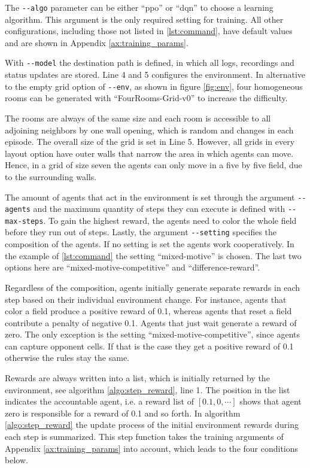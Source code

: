 The \verb|--algo| parameter can be either ``ppo'' or ``dqn'' to choose a learning algorithm. This argument is the only required setting for training. All other configurations, including those not listed in \ref{lst:command}, have default values and are shown in Appendix \ref{ax:training_params}.

With \verb|--model| the destination path is defined, in which all logs, recordings and status updates are stored. Line 4 and 5 configures the environment. In alternative to the empty grid option of \verb|--env|, as shown in figure \ref{fig:env}, four homogeneous rooms can be generated with ``FourRooms-Grid-v0'' to increase the difficulty. 

The rooms are always of the same size and each room is accessible to all adjoining neighbors by one wall opening, which is random and changes in each episode. The overall size of the grid is set in Line 5. However, all grids in every layout option have outer walls that narrow the area in which agents can move. Hence, in a grid of size seven the agents can only move in a five by five field, due to the surrounding walls.

The amount of agents that act in the environment is set through the argument \verb|--agents| and the maximum quantity of steps they can execute is defined with \verb|--max-steps|. To gain the highest reward, the agents need to color the whole field before they run out of steps. Lastly, the argument \verb|--setting| specifies the composition of the agents. If no setting is set the agents work cooperatively. In the example of \ref{lst:command} the setting ``mixed-motive'' is chosen. The last two options here are ``mixed-motive-competitive'' and ``difference-reward''.

Regardless of the composition, agents initially generate separate rewards in each step based on their individual environment change. For instance, agents that color a field produce a positive reward of 0.1, whereas agents that reset a field contribute a penalty of negative 0.1. Agents that just wait generate a reward of zero. The only exception is the setting ``mixed-motive-competitive'', since agents can capture opponent cells. If that is the case they get a positive reward of 0.1 otherwise the rules stay the same. 

Rewards are always written into a list, which is initially returned by the environment, see algorithm \ref{algo:step_reward}, line 1. The position in the list indicates the accountable agent, i.e. a reward list of $[0.1, 0, \cdots ]$ shows that agent zero is responsible for a reward of 0.1 and so forth. In algorithm \ref{algo:step_reward} the update process of the initial environment rewards during each step is summarized. This step function takes the training arguments of Appendix \ref{ax:training_params} into account, which leads to the four conditions below.

